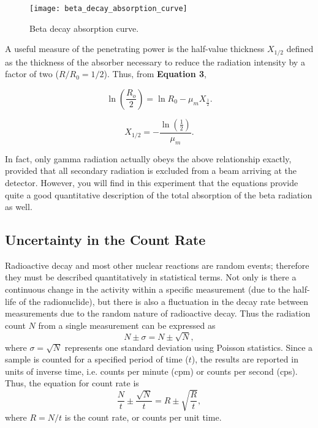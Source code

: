 \documentclass[a4paper,11pt]{article}
\begin{document}
\begin{figure}[h]
    \centering
    \texttt{[image: beta\_decay\_absorption\_curve]}
    \caption{Beta decay absorption curve.}
    \label{fig:beta_decay}
\end{figure}

A useful measure of the penetrating power is the half-value thickness $X_{1/2}$ defined as the thickness of the absorber necessary to reduce the radiation intensity by a factor of two ($R/R_0 = 1/2$). Thus, from \textbf{Equation 3},

\begin{equation}
\ln (\frac{R_o}{2}) = \ln R_0 - \mu_m X_{\frac{1}{2}}.
\end{equation}

\begin{equation}
X_{1/2} = -\frac{\ln \left(\frac{1}{2}\right)}{\mu_m}.
\end{equation}

In fact, only gamma radiation actually obeys the above relationship exactly, provided that all secondary radiation is excluded from a beam arriving at the detector. However, you will find in this experiment that the equations provide quite a good quantitative description of the total absorption of the beta radiation as well.

\subsection*{Uncertainty in the Count Rate}
Radioactive decay and most other nuclear reactions are random events; therefore they must be described quantitatively in statistical terms. Not only is there a continuous change in the activity within a specific measurement (due to the half-life of the radionuclide), but there is also a fluctuation in the decay rate between measurements due to the random nature of radioactive decay. Thus the radiation count $N$ from a single measurement can be expressed as
\begin{equation}
N \pm \sigma = N \pm \sqrt{N},
\end{equation}
where $\sigma = \sqrt{N}$ represents one standard deviation using Poisson statistics. Since a sample is counted for a specified period of time ($t$), the results are reported in units of inverse time, i.e. counts per minute (cpm) or counts per second (cps). Thus, the equation for count rate is
\begin{equation}
\frac{N}{t} \pm \frac{\sqrt{N}}{t} = R \pm \sqrt{\frac{R}{t}},
\end{equation}
where $R = N/t$ is the count rate, or counts per unit time.\\
\end{document}
